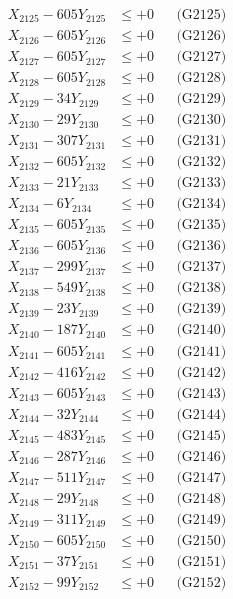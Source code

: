 \documentclass[a4paper,10pt]{article}
\begin{document}
{\begin{align}
X_{2125} - 605Y_{2125} &\leq +0 && \text{(G2125)} \\
X_{2126} - 605Y_{2126} &\leq +0 && \text{(G2126)} \\
X_{2127} - 605Y_{2127} &\leq +0 && \text{(G2127)} \\
X_{2128} - 605Y_{2128} &\leq +0 && \text{(G2128)} \\
X_{2129} - 34Y_{2129} &\leq +0 && \text{(G2129)} \\
X_{2130} - 29Y_{2130} &\leq +0 && \text{(G2130)} \\
\allowbreak
X_{2131} - 307Y_{2131} &\leq +0 && \text{(G2131)} \\
X_{2132} - 605Y_{2132} &\leq +0 && \text{(G2132)} \\
X_{2133} - 21Y_{2133} &\leq +0 && \text{(G2133)} \\
X_{2134} - 6Y_{2134} &\leq +0 && \text{(G2134)} \\
X_{2135} - 605Y_{2135} &\leq +0 && \text{(G2135)} \\
X_{2136} - 605Y_{2136} &\leq +0 && \text{(G2136)} \\
X_{2137} - 299Y_{2137} &\leq +0 && \text{(G2137)} \\
X_{2138} - 549Y_{2138} &\leq +0 && \text{(G2138)} \\
X_{2139} - 23Y_{2139} &\leq +0 && \text{(G2139)} \\
X_{2140} - 187Y_{2140} &\leq +0 && \text{(G2140)} \\
\allowbreak
X_{2141} - 605Y_{2141} &\leq +0 && \text{(G2141)} \\
X_{2142} - 416Y_{2142} &\leq +0 && \text{(G2142)} \\
X_{2143} - 605Y_{2143} &\leq +0 && \text{(G2143)} \\
X_{2144} - 32Y_{2144} &\leq +0 && \text{(G2144)} \\
X_{2145} - 483Y_{2145} &\leq +0 && \text{(G2145)} \\
X_{2146} - 287Y_{2146} &\leq +0 && \text{(G2146)} \\
X_{2147} - 511Y_{2147} &\leq +0 && \text{(G2147)} \\
X_{2148} - 29Y_{2148} &\leq +0 && \text{(G2148)} \\
X_{2149} - 311Y_{2149} &\leq +0 && \text{(G2149)} \\
X_{2150} - 605Y_{2150} &\leq +0 && \text{(G2150)} \\
\allowbreak
X_{2151} - 37Y_{2151} &\leq +0 && \text{(G2151)} \\
X_{2152} - 99Y_{2152} &\leq +0 && \text{(G2152)} \\

\end{align}}
\end{document}
